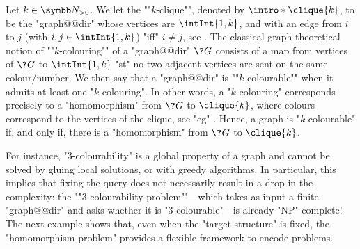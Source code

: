 \begin{marginfigure}[-10em]
	\centering
	\begin{tikzpicture}
		
	\end{tikzpicture}
	\caption{
		\AP\label{fig:intro-3-clique}
		The "$3$-clique" $\clique{3}$.
	}
\end{marginfigure}
\begin{marginfigure}
	\centering
	\begin{tikzpicture}
		
	\end{tikzpicture}
	\caption{
		\AP\label{fig:dichotomy-ex-3-clique}
		A "$3$-colouring" of some beetle-shaped "graph@@dir".
	}
\end{marginfigure}
\begin{example}
	\AP\label{ex:graph-colouring-as-hom}
	Let $k\in\Np$. We let the \AP""$k$-clique"", denoted by $\intro*\clique{k}$,
	to be the "graph@@dir" whose vertices are $\intInt{1,k}$,
	and with an edge from $i$ to $j$ (with $i,j \in \intInt{1,k}$)
	"iff" $i\neq j$, see .
	The classical graph-theoretical notion of \AP""$k$-colouring""
	of a "graph@@dir" $\?G$ consists of
	a map from vertices of $\?G$ to $\intInt{1,k}$
	"st" no two adjacent vertices are sent on the same colour/number.
	We then say that a "graph@@dir" is \AP""$k$-colourable"" when
	it admits at least one "$k$-colouring".
	In other words, a "$k$-colouring" corresponds precisely to a "homomorphism" from $\?G$
	to $\clique{k}$, where colours correspond to the vertices of the clique,
	see "eg" .
	Hence, a graph is "$k$-colourable" if, and only if,
	there is a "homomorphism" from $\?G$ to $\clique{k}$.
\end{example}

For instance, "$3$-colourability" is a global property of a graph and cannot be solved
by gluing local solutions, or with greedy algorithms.
In particular, this implies that fixing the query
does not necessarily result in
a drop in the complexity: the \AP ""$3$-colourability problem""---which takes as input a finite "graph@@dir" and asks whether it is "$3$-colourable"---is already "NP"-complete!
The next example shows that, even when the "target structure" is fixed, the "homomorphism problem"
provides a flexible framework to encode problems.

